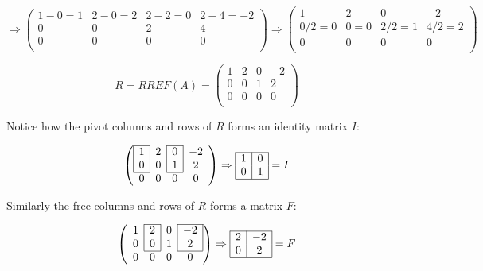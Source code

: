 \documentclass[12pt]{article}
\begin{document}
\[
\Rightarrow
\left(
    \begin{matrix}
        1-0=1 & 2-0=2 & 2-2=0 & 2-4=-2\\
        0 & 0 & 2 & 4\\
        0 & 0 & 0 & 0\\
    \end{matrix}
\right)
\Rightarrow
\left(
    \begin{matrix}
        1 & 2 & 0 & -2\\
        0/2=0 & 0=0 & 2/2=1 & 4/2=2\\
        0 & 0 & 0 & 0\\
    \end{matrix}
\right)
\]

\[
R=RREF(A)=
\left(
    \begin{matrix}
        \boxed{1} & 2 & 0 & -2\\
        0 & 0 & \boxed{1} & 2\\
        0 & 0 & 0 & 0\\
    \end{matrix}
\right)
\]

Notice how the pivot columns and rows of $R$ forms an identity matrix $I$:

\[
\left(
    \begin{array}{*{4}{c}}
    \cline{1-1}\cline{3-3}
    \multicolumn{1}{|c|}{1} & 2 & \multicolumn{1}{|c|}{0} & -2\\
    \multicolumn{1}{|c|}{0} & 0 & \multicolumn{1}{|c|}{1} & 2\\
    \cline{1-1}\cline{3-3}
    0 & 0 & 0 & 0\\
    \end{array}
\right)
\Rightarrow
    \begin{array}{*{2}{c}}
    \cline{1-2}
    \multicolumn{1}{|c|}{1} & \multicolumn{1}{c|}{0}\\
    \multicolumn{1}{|c|}{0} & \multicolumn{1}{c|}{1}\\
    \cline{1-2}
    \end{array}
=I
\]

Similarly the free columns and rows of $R$ forms a matrix $F$:

\[
\left(
    \begin{array}{*{4}{c}}
    \cline{2-2}\cline{4-4}
    1 & \multicolumn{1}{|c|}{2} & 0 & \multicolumn{1}{|c|}{-2}\\
    0 & \multicolumn{1}{|c|}{0} & 1 & \multicolumn{1}{|c|}{2}\\
    \cline{2-2}\cline{4-4}
    0 & 0 & 0 & 0\\
    \end{array}
\right)
\Rightarrow
    \begin{array}{*{2}{c}}
    \cline{1-2}
    \multicolumn{1}{|c|}{2} & \multicolumn{1}{c|}{-2}\\
    \multicolumn{1}{|c|}{0} & \multicolumn{1}{c|}{2}\\
    \cline{1-2}
    \end{array}
=F
\]
\end{document}
